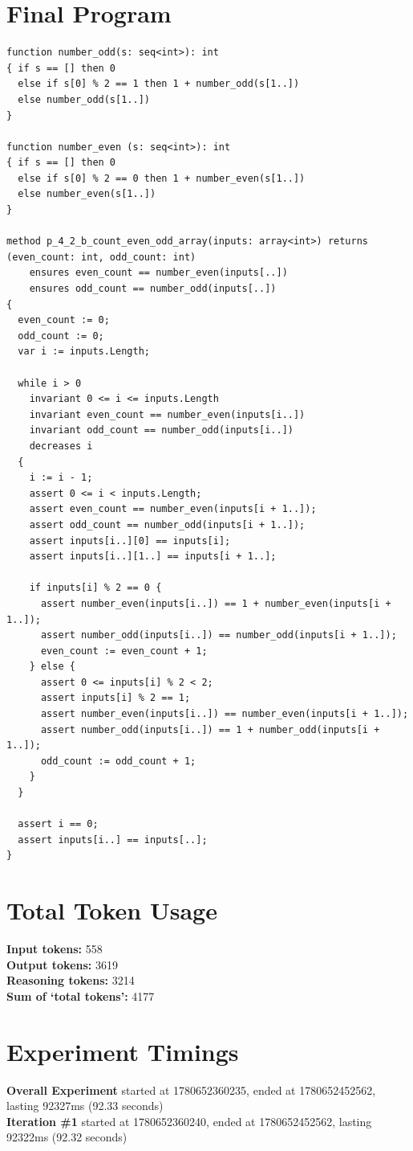 \documentclass{article}
\begin{document}
\section*{Final Program}
\begin{lstlisting}
function number_odd(s: seq<int>): int
{ if s == [] then 0
  else if s[0] % 2 == 1 then 1 + number_odd(s[1..])
  else number_odd(s[1..])
}

function number_even (s: seq<int>): int
{ if s == [] then 0
  else if s[0] % 2 == 0 then 1 + number_even(s[1..])
  else number_even(s[1..])
}

method p_4_2_b_count_even_odd_array(inputs: array<int>) returns (even_count: int, odd_count: int)
	ensures even_count == number_even(inputs[..])
	ensures odd_count == number_odd(inputs[..])
{
  even_count := 0;
  odd_count := 0;
  var i := inputs.Length;

  while i > 0
    invariant 0 <= i <= inputs.Length
    invariant even_count == number_even(inputs[i..])
    invariant odd_count == number_odd(inputs[i..])
    decreases i
  {
    i := i - 1;
    assert 0 <= i < inputs.Length;
    assert even_count == number_even(inputs[i + 1..]);
    assert odd_count == number_odd(inputs[i + 1..]);
    assert inputs[i..][0] == inputs[i];
    assert inputs[i..][1..] == inputs[i + 1..];

    if inputs[i] % 2 == 0 {
      assert number_even(inputs[i..]) == 1 + number_even(inputs[i + 1..]);
      assert number_odd(inputs[i..]) == number_odd(inputs[i + 1..]);
      even_count := even_count + 1;
    } else {
      assert 0 <= inputs[i] % 2 < 2;
      assert inputs[i] % 2 == 1;
      assert number_even(inputs[i..]) == number_even(inputs[i + 1..]);
      assert number_odd(inputs[i..]) == 1 + number_odd(inputs[i + 1..]);
      odd_count := odd_count + 1;
    }
  }

  assert i == 0;
  assert inputs[i..] == inputs[..];
}
\end{lstlisting}
\section*{Total Token Usage}
\textbf{Input tokens: }558
\\\textbf{Output tokens: }3619
\\\textbf{Reasoning tokens: }3214
\\\textbf{Sum of `total tokens': }4177
\section*{Experiment Timings}
\textbf{Overall Experiment} started at 1780652360235, ended at 1780652452562, lasting 92327ms (92.33 seconds)
\\\textbf{Iteration \#1} started at 1780652360240, ended at 1780652452562, lasting 92322ms (92.32 seconds)
\end{document}
